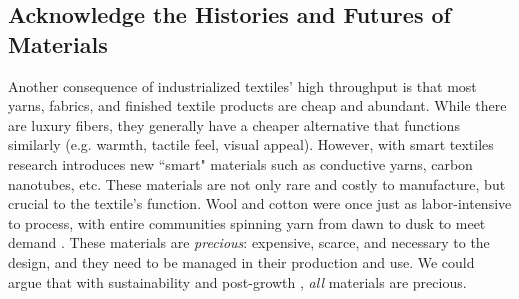 \documentclass{sigchi}
\begin{document}



\subsection{Acknowledge the Histories and Futures of Materials}

Another consequence of industrialized textiles' high throughput is that most yarns, fabrics, and finished textile products are cheap and abundant. While there are luxury fibers, they generally have a cheaper alternative that functions similarly (e.g. warmth, tactile feel, visual appeal). However, with smart textiles research introduces new ``smart" materials such as conductive yarns, carbon nanotubes, etc. These materials are not only rare and costly to manufacture, but crucial to the textile's function. Wool and cotton were once just as labor-intensive to process, with entire communities spinning yarn from dawn to dusk to meet demand \cite{black_knitting:_2012}. These materials are \emph{precious}: expensive, scarce, and necessary to the design, and they need to be managed in their production and use. We could argue that with sustainability and post-growth \cite{fletcher_craft_2016}, \emph{all} materials are precious.
\end{document}
